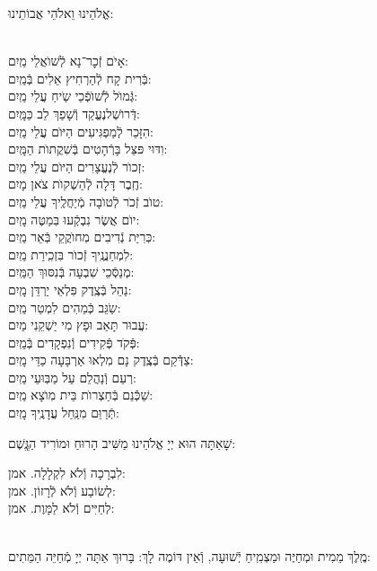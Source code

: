 \documentclass[twoside, openany, parskip=half, 11pt]{book}
\begin{document}
\begin{small}אֱלֹהֵינוּ וֵאלֹהֵי אֲבוֹתֵינוּ:\end{small}\\
אָיׂם זְֿכׇר־נָא לְֿשׁוׂאֲלֵי \hfill מַֽיִם:\\
בְּֿרִית קָח לְֿהַרְחִיץ אֵלִים \hfill בְּֿמַֽיִם:\\
גְּֿמוׂל לְֿשׁוׂפְֿכֵי שִֹֽיחַ עֲלֵי \hfill מַֽיִם:\\
דְּֿרוׂשְׁלנֶעֱקַד וְֿשָׁפַךְ לֵב \hfill כַּמָּֽיִם:\\
הִזָּכֵר לְֿמַפְגִּיעִים הַיּוׂם עֲלֵי \hfill מַֽיִם:\\
וִדּוּי פּצֵּל בָּרְֿהָטִים בְּֿשִׁקֲתוׂת \hfill הַמָּֽיִם:\\
זְכוׂר לְֿנֶעֱצָרִים הַיּוׂם עֲלֵי \hfill מַֽיִם:\\
חֶֽבֶר דָּלָה לְֿהַשְׁקוׂת צׂאן \hfill מָיִם:\\
טוׂב זְֿכׂר לְֿטוׂבָה מְֿיַחֲלֶֽיךָ עֲלֵי \hfill מַֽיִם:\\
יוׂם אֲשֶׂר נִבְקְֿעוּ בּֽמַטֶּה \hfill מָֽיִם:\\
כּֽרִיַּת נְֿדִיבִים מֽחוׂקֲקֵי בְּֿאֵר \hfill מַֽיִם:\\
לִמְחַנֲנֶֽיךָ זְֿכוׂר בִּזְכִֽירַת \hfill מַֽיִם:\\
מְנַסְּֿכֵי שִׁבְעָה בְּֿנִסּוּךְ \hfill הַמַּֽיִם:\\
נַהֵל בְּֿצֶֽדֶק פִּלְאֵי יַרְדֵּן \hfill מָֽיִם:\\
שַֹגֵּב כְּֿמֵהִים לִמְטַר \hfill מַֽיִם:\\
עֲבוּר תָּאַב וּפָץ מִי יַשְׁקֵנִי \hfill מַיִם:\\
פְּֿקׂד פְּֿקִידִים וְֿנִפְקָדִים \hfill בְּֿמַֽיִם:\\
צַדְּֿֿקֵם בְּֿצֶֽדֶק נָם מִלְאוּ אַרְבָּעָה כַדֵּי \hfill מָֽיִם:\\
רְעֵם וְֿנַהֲלֵם עַל מַבּֽוּעֵי \hfill מַֽיִם:\\
שַׁכְּֿֿנֵם בְּֿחַצְרוׂת בֵּית מֽוׂצָא \hfill מַֽיִם:\\
תְּֿרַוֵּם מִנַּֽחַל עֲדָנֶֽיךָ \hfill מָֽיִם:

שָׁאַתָּה הוּא יְיָ אֱלֹהֵינוּ מַשִּׁיב הָרוּחַ וּמוֹרִיד הַגֱּֽשֶׁם:

לִבְרָכָה וְֿלֹא לִקְלָלָה. \hfill אמן:\\
לְשׂוֹבַע וְֿלֹא לְֿרָזוֹן. \hfill אמן:\\
לְחַיִּים וְֿלֹא לַמָּוֶת. \hfill אמן:

\\
מֶֽלֶךְ מֵמִית וּמְחַיֶּה וּמַצְמִֽיחַ יְֿשׁוּעָה, וְֿאֵין דּוֹמֶה לָךְ: בָּרוּךְ אַתָּה יְיָ מְֿחַיֵּה הַמֵּתִים:
\end{document}
